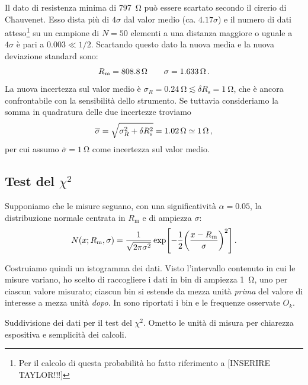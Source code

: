             Il dato di resistenza minima di \SI{797}{\ohm} può essere scartato secondo il cirerio di Chauvenet. Esso dista più di $4\sigma$ dal valor medio (ca. $\num{4.17}\sigma$) e il numero di dati atteso\footnote{Per il calcolo di questa probabilità ho fatto riferimento a [INSERIRE TAYLOR!!!]} su un campione di $N = 50$ elementi a una distanza maggiore o uguale a $4\sigma$ è pari a $\num{0.003} \ll 1/2$. Scartando questo dato la nuova media e la nuova deviazione standard sono:
            \begin{equation*}
                R_\text{m} = \SI{808.8}{\ohm}
                \qquad
                \sigma = \SI{1.633}{\ohm}
                \,.
            \end{equation*}
            La nuova incertezza sul valor medio è $\sigma_R = \SI{0.24}{\ohm} \lesssim \delta R_\text{s} = \SI{1}{\ohm}$, che è ancora confrontabile con la sensibilità dello strumento. Se tuttavia consideriamo la somma in quadratura delle due incertezze troviamo
            \begin{equation*}
                \overline{\sigma}
                = \sqrt{\sigma_R^2 + \delta R_\text{s}^2}
                = \SI{1.02}{\ohm}
                \simeq \SI{1}{\ohm}
                \,,
            \end{equation*}
            per cui assumo $\overline{\sigma} = \SI{1}{\ohm}$ come incertezza sul valor medio.

        \subsection{Test del $\chi^2$}
            Supponiamo che le misure seguano, con una significatività $\alpha = \num{0.05}$, la distribuzione normale centrata in $R_\text{m}$ e di ampiezza $\sigma$:
            \begin{equation*}
                N\pqty{x; R_\text{m}, \sigma}
                = \frac{1}{\sqrt{2\pi\sigma^2}} \exp[ -\frac{1}{2}\pqty{\frac{x - R_\text{m}}{\sigma}}^2]
                \myperiod
            \end{equation*}
            
            Costruiamo quindi un istogramma dei dati. Visto l'intervallo contenuto in cui le misure variano, ho scelto di raccogliere i dati in bin di ampiezza \SI{1}{\ohm}, uno per ciascun valore misurato; ciascun bin si estende da mezza unità \emph{prima} del valore di interesse a mezza unità \emph{dopo}. In  sono riportati i bin e le frequenze osservate $O_k$.
            \begin{table}
                \centering
                
                \caption{Suddivisione dei dati per il test del $\chi^2$. Ometto le unità di misura per chiarezza espositiva e semplicità dei calcoli.}
                \label{tab:mul:bin-istogramma}
            \end{table}


